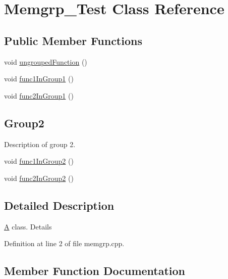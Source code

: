 \hypertarget{class_memgrp___test}{}\section{Memgrp\+\_\+\+Test Class Reference}
\label{class_memgrp___test}
\subsection*{Public Member Functions}
\begin{DoxyCompactItemize}
\item 
void \hyperlink{class_memgrp___test_aacc99537766f0636d0b7859f710435c7}{ungrouped\+Function} ()
\end{DoxyCompactItemize}
\textbf{ }\par
\begin{DoxyCompactItemize}
\item 
void \hyperlink{class_memgrp___test_a9a4244281b20ec21e06d07e6203b8644}{func1\+In\+Group1} ()
\item 
void \hyperlink{class_memgrp___test_a1c88d8c249f4fc6bf63b2f7b5b2e9130}{func2\+In\+Group1} ()
\end{DoxyCompactItemize}

\subsection*{Group2}
\label{_amgrp6be2faefeff8740e94471f5ae04da6d0}%
Description of group 2. \begin{DoxyCompactItemize}
\item 
void \hyperlink{class_memgrp___test_a830fbb771817008ac58a211d63b4149a}{func1\+In\+Group2} ()
\item 
void \hyperlink{class_memgrp___test_ac8edb233ae7671a1c0280604440f482e}{func2\+In\+Group2} ()
\end{DoxyCompactItemize}


\subsection{Detailed Description}
\hyperlink{class_a}{A} class. Details 

Definition at line 2 of file memgrp.\+cpp.



\subsection{Member Function Documentation}
\mbox{\label{class_memgrp___test_a9a4244281b20ec21e06d07e6203b8644}} 
